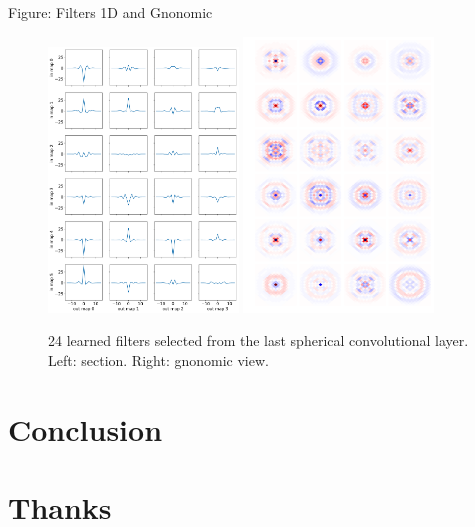 \documentclass[final,twocolumn,3p,times,authoryear]{elsarticle}
\newcommand{\assign}[1]{{\color[rgb]{.8,.5,.8}{Assigned: #1 }}}
\newcommand{\1}{\b{1}}              %
\newcommand{\0}{\b{0}}              %
\begin{document}
Figure: Filters 1D and Gnonomic
\begin{figure}[!ht]
\centering
\includegraphics[width=0.45\textwidth]{figures/section_filter_last.pdf} 
\includegraphics[width=0.45\textwidth]{figures/gnonomic_filter_last.pdf}
\caption{24 learned filters selected from the last spherical convolutional layer. Left: section. Right: gnonomic view.}
\label{fig:learned_filter}
\end{figure}


\section{Conclusion}
\label{sec:conclusion}
\assign{Nathanaël, Tomek, Michaël}

\section*{Thanks}
\end{document}
